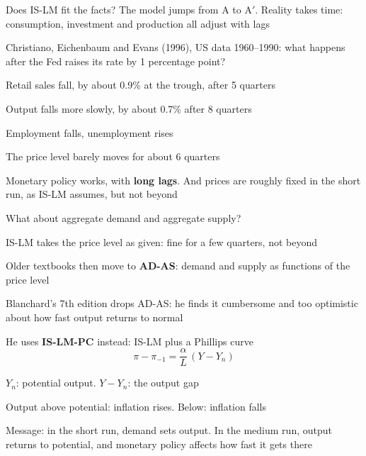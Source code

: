 \documentclass[aspectratio=169,xcolor=table]{beamer}
\begin{document}
\begin{frame}{Does IS-LM fit the facts?}
\footnotesize
The model jumps from A to A$'$. Reality takes time: consumption, investment and production all adjust with lags
\vspace{0.1cm}

Christiano, Eichenbaum and Evans (1996), US data 1960--1990: what happens after the Fed raises its rate by 1 percentage point?
\bi
  \item Retail sales fall, by about 0.9\% at the trough, after 5 quarters
  \item Output falls more slowly, by about 0.7\% after 8 quarters
  \item Employment falls, unemployment rises
  \item The price level barely moves for about 6 quarters
\ei
\vspace{0.1cm}
\begin{block}{}
Monetary policy works, with \textbf{long lags}. And prices are roughly fixed in the short run, as IS-LM assumes, but not beyond
\end{block}
\end{frame}

\begin{frame}{What about aggregate demand and aggregate supply?}
\footnotesize
\bi
  \item IS-LM takes the price level as given: fine for a few quarters, not beyond
  \item Older textbooks then move to \textbf{AD-AS}: demand and supply as functions of the price level
  \item Blanchard's 7th edition drops AD-AS: he finds it cumbersome and too optimistic about how fast output returns to normal
  \item He uses \textbf{IS-LM-PC} instead: IS-LM plus a Phillips curve
  \[
  \pi - \pi_{-1} = \frac{\alpha}{L}\,(Y - Y_n)
  \]
  \bi
    \item $Y_n$: potential output. $Y - Y_n$: the output gap
    \item Output above potential: inflation rises. Below: inflation falls
  \ei
  \item Message: in the short run, demand sets output. In the medium run, output returns to potential, and monetary policy affects how fast it gets there
\ei
{}
\end{frame}
\end{document}
